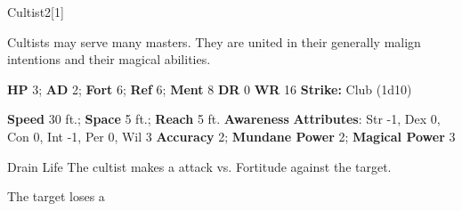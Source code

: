   \begin{monsection}{Cultist}{2}[1]
    \vspace{-1em}\vspace{-1em}
    \vspace{0em}

    
      Cultists may serve many masters.
      They are united in their generally malign intentions and their magical abilities.
    

    \begin{spellcontent}
      \begin{spelltargetinginfo}
        \pari \textbf{HP} 3;
          \textbf{AD} 2;
          \textbf{Fort} 6;
          \textbf{Ref} 6;
          \textbf{Ment} 8
        \pari \textbf{DR} 0
        \pari \textbf{WR} 16
        \pari \textbf{Strike:}
            Club  (1d10)
      \end{spelltargetinginfo}
    \end{spellcontent}
    \begin{monsterfooter}
      \pari \textbf{Speed} 30 ft.;
        \textbf{Space} 5 ft.;
        \textbf{Reach} 5 ft.
      \pari \textbf{Awareness} 
      \pari \textbf{Attributes}:
        Str -1, Dex 0,
        Con 0, Int -1,
        Per 0, Wil 3
      \pari \textbf{Accuracy} 2;
        \textbf{Mundane Power} 2;
      \textbf{Magical Power} 3
    \end{monsterfooter}
  \end{monsection}
  \begin{freeability}{Drain Life}
      The cultist makes a  attack
        vs. Fortitude against the target.
    
    \hit The target loses a 
    \end{freeability}
  
